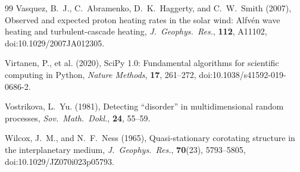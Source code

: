 \documentclass[12pt,letterpaper]{article}
\begin{document}
\begin{thebibliography}{99}
Vasquez, B.~J., C.~Abramenko, D.~K.~Haggerty, and C.~W.~Smith (2007),
Observed and expected proton heating rates in the solar wind: Alfv\'en wave
heating and turbulent-cascade heating,
\textit{J.\ Geophys.\ Res.}, \textbf{112}, A11102,
doi:10.1029/2007JA012305.

Virtanen, P., et al. (2020),
SciPy 1.0: Fundamental algorithms for scientific computing in Python,
\textit{Nature Methods}, \textbf{17}, 261--272,
doi:10.1038/s41592-019-0686-2.

Vostrikova, L.~Yu. (1981),
Detecting ``disorder'' in multidimensional random processes,
\textit{Sov.\ Math.\ Dokl.}, \textbf{24}, 55--59.

Wilcox, J.~M., and N.~F.~Ness (1965),
Quasi-stationary corotating structure in the interplanetary medium,
\textit{J.\ Geophys.\ Res.}, \textbf{70}(23), 5793--5805,
doi:10.1029/JZ070i023p05793.

\end{thebibliography}
\end{document}
